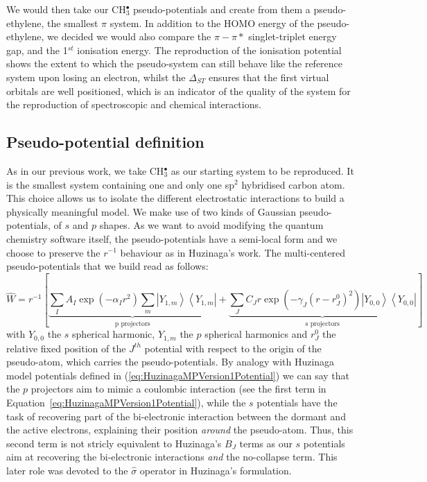 \documentclass[12pt]{article}
\begin{document}
We would then take our CH$_3^{\bullet}$ pseudo-potentials and create from them a pseudo-ethylene, the smallest $\pi$ system. 
In addition to the HOMO energy of the pseudo-ethylene, we decided we would also compare the $\pi-\pi*$ singlet-triplet energy gap, 
and the 1$^{st}$ ionisation energy. The reproduction of the ionisation potential shows the extent to which the pseudo-system 
can still behave like the reference system upon losing an electron, whilst the $\Delta_{ST}$ ensures that the first virtual 
orbitals are well positioned, which is an indicator of the quality of the system for the reproduction of spectroscopic and 
chemical interactions.

\subsection*{\sffamily \large Pseudo-potential definition} \label{secpotdef}

As in our previous work\cite{drujon_pseudopotentials_2013},
we take CH\(^{\bullet}_{3}\) as our starting system to be reproduced.
It is the smallest system containing one and only one sp$^2$ hybridised carbon atom. This choice allows us to isolate the different electrostatic interactions to build a physically meaningful model. We make use of two kinds of Gaussian pseudo-potentials, \cite{me_structure_theory} of \(s\) and \(p\) shapes. As we want to avoid modifying the quantum chemistry software itself, the pseudo-potentials have a semi-local form and we choose to preserve the \(r^{-1}\) behaviour as in Huzinaga's work.
The multi-centered pseudo-potentials that we build read as follows:
\begin{equation}
\label{eq:ourPP}
\hat{W} = r^{-1}\left[%
\underbrace{\sum_IA_I\exp(-\alpha_I r^2)\sum_m\left|Y_{1,m}\right>\left<Y_{1,m}\right|}_{\text{p projectors}}%
+%
\underbrace{\sum_JC_Jr\exp(-\gamma_J (r-r^0_J)^2)\left|Y_{0,0}\right>\left<Y_{0,0}\right|}_{\text{s projectors}}%
\right]
\end{equation}
with $Y_{0,0}$ the $s$ spherical harmonic, $Y_{1,m}$ the $p$ spherical harmonics and $r^0_J$ the relative fixed position of the $J^{th}$ potential with respect to the origin of the pseudo-atom, which carries the pseudo-potentials.
By analogy with Huzinaga model potentials defined in (\ref{eq:HuzinagaMPVersion1Potential})
we can say that the $p$ projectors aim to mimic a coulombic interaction (see the first term in Equation~\ref{eq:HuzinagaMPVersion1Potential}),
while the $s$ potentials have the task of recovering part of the bi-electronic interaction
between the dormant and the active electrons, explaining their position \textit{around} the pseudo-atom.
Thus, this second term is not stricly equivalent to Huzinaga's $B_J$ terms as our $s$ potentials aim at recovering
the bi-electronic interactions \textit{and} the no-collapse term.
This later role was devoted to the $\hat{\sigma}$ operator in Huzinaga's formulation.
\end{document}
